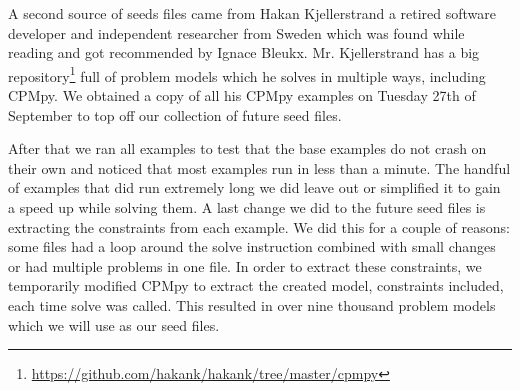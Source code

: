 A second source of seeds files came from Hakan Kjellerstrand a retired software developer and independent researcher from Sweden which was found while reading \cite{18bleukx2022model} and got recommended by Ignace Bleukx. Mr. Kjellerstrand has a big repository\footnote{\url{https://github.com/hakank/hakank/tree/master/cpmpy}} full of problem models which he solves in multiple ways, including CPMpy. We obtained a copy of all his CPMpy examples on Tuesday 27th of September to top off our collection of future seed files.


After that we ran all examples to test that the base examples do not crash on their own and noticed that most examples run in less than a minute. The handful of examples that did run extremely long we did leave out or simplified it to gain a speed up while solving them. A last change we did to the future seed files is extracting the constraints from each example. We did this for a couple of reasons: some files had a loop around the solve instruction combined with small changes or had multiple problems in one file. In order to extract these constraints, we temporarily modified CPMpy to extract the created model, constraints included, each time solve was called. This resulted in over nine thousand problem models which we will use as our seed files.



